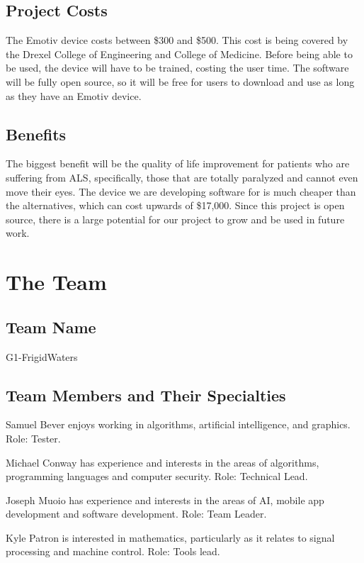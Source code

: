\documentclass{report}
\begin{document}
\subsection*{Project Costs}
The Emotiv device\cite{Emotiv} costs between \$300 and \$500. This cost is
being covered by the Drexel College of Engineering and College of Medicine.
Before being able to be used, the device will have to be trained, costing the
user time. The software will be fully open source, so it will be free for
users to download and use as long as they have an Emotiv device.

\subsection*{Benefits}
The biggest benefit will be the quality of life improvement for patients who
are suffering from ALS, specifically, those that are totally paralyzed and
cannot even move their eyes. The device we are developing software for is
much cheaper than the alternatives, which can cost upwards of \$17,000.
Since this project is open source, there is a large potential for our
project to grow and be used in future work.

\newpage
\section*{\centering The Team}

\subsection*{Team Name}

G1-FrigidWaters

\subsection*{Team Members and Their Specialties}

Samuel Bever enjoys working in algorithms, artificial intelligence, and
graphics. Role: Tester.

Michael Conway has experience and interests in the areas of algorithms,
programming languages and computer security. Role: Technical Lead.

Joseph Muoio has experience and interests in the areas of AI, mobile app
development and software development. Role: Team Leader.

Kyle Patron is interested in mathematics, particularly as it relates to
signal processing and machine control. Role: Tools lead.
\end{document}
